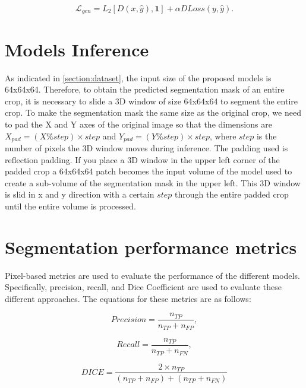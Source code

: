 \begin{equation}
\label{eq:vox2vox-generator-loss}
    \mathcal{L}_{gen} = L_2[D(x,\hat{y}),\boldsymbol{1}] + \alpha DLoss(y,\hat{y}).
\end{equation}

\section{Models Inference}
\label{section:models_inference}

As indicated in \ref{section:dataset}, the input size of the proposed models is 64x64x64. Therefore, to obtain the predicted segmentation mask of an entire crop, it is necessary to slide a 3D window of size 64x64x64 to segment the entire crop. To make the segmentation mask the same size as the original crop, we need to pad the X and Y axes of the original image so that the dimensions are $X_{pad} = (X \% step) \times step $ and $Y_{pad} = (Y \% step) \times step $, where $step$ is the number of pixels the 3D window moves during inference. The padding used is reflection padding. If you place a 3D window in the upper left corner of the padded crop a 64x64x64 patch becomes the input volume of the model used to create a sub-volume of the segmentation mask in the upper left. This 3D window is slid in x and y direction with a certain $step$ through the entire padded crop until the entire volume is processed.


\section{Segmentation performance metrics}
\label{section:metrics}

Pixel-based metrics are used to evaluate the performance of the different models. Specifically, precision, recall, and Dice Coefficient are used to evaluate these different approaches. The equations for these metrics are as follows:

\begin{equation}
    Precision = \frac{n_{TP}}{n_{TP}+n_{FP}},
\end{equation}

\begin{equation}
    Recall = \frac{n_{TP}}{n_{TP}+n_{FN}},
\end{equation}

\begin{equation}
 DICE =\frac{2 \times n_{TP}}{(n_{TP}+n_{FP})+(n_{TP}+n_{FN})}
\end{equation}

